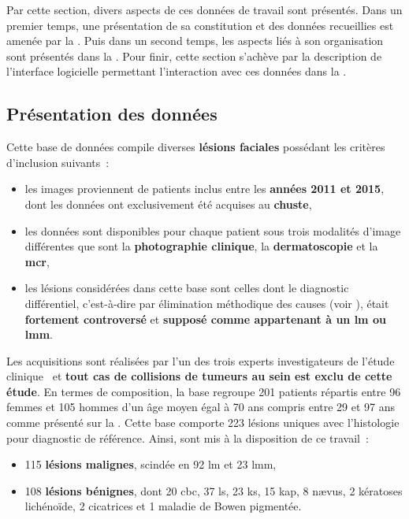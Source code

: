 Par cette section, divers aspects de ces données de travail sont présentés. Dans un premier temps, une présentation de sa constitution et des données recueillies est amenée par la . Puis dans un second temps, les aspects liés à son organisation sont présentés dans la . Pour finir, cette section s'achève par la description de l'interface logicielle permettant l'interaction avec ces données dans la .\par

\subsection{Présentation des données}
\label{sec:dataset_introduction}
Cette base de données compile diverses \textbf{lésions faciales} possédant les critères d'inclusion suivants~:
\begin{itemize}
    \item les images proviennent de patients inclus entre les \textbf{années 2011 et 2015}, dont les données ont exclusivement été acquises au \textbf{\gls{chuste}},
    \item les données sont disponibles pour chaque patient sous trois modalités d'image différentes que sont la \textbf{photographie clinique}, la \textbf{dermatoscopie} et la \textbf{\gls{mcr}},
    \item les lésions considérées dans cette base sont celles dont le diagnostic différentiel, c’est-à-dire par élimination méthodique des causes (voir ), était \textbf{fortement controversé} et \textbf{supposé comme appartenant à un \gls{lm} ou \gls{lmm}}.
\end{itemize}\par

Les acquisitions sont réalisées par l'un des trois experts investigateurs de l'étude clinique~\cite{Cinotti2018} et \textbf{tout cas de collisions de tumeurs au sein est exclu de cette étude}. En termes de composition, la base regroupe 201 patients répartis entre 96 femmes et 105 hommes d'un âge moyen égal à 70 ans compris entre 29 et 97 ans comme présenté sur la . Cette base comporte 223 lésions uniques avec l'histologie pour diagnostic de référence. Ainsi, sont mis à la disposition de ce travail~:
\begin{itemize}
    \item 115 \textbf{lésions malignes}, scindée en 92 \gls{lm} et 23 \gls{lmm},
    \item 108 \textbf{lésions bénignes}, dont 20 \gls{cbc}, 37 \gls{ls}, 23 \gls{ks}, 15 \gls{kap}, 8 nævus, 2 kératoses lichénoïde, 2 cicatrices et 1 maladie de Bowen pigmentée.
\end{itemize}\par


